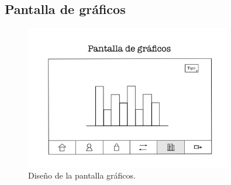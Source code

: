 \newpage

\subsection{Pantalla de gráficos}

\begin{figure}[ht]
	\centering
	\includegraphics[width=0.8\textwidth, angle=270]{imagenes/pantalla_graficos.JPG}
	\caption{Diseño de la pantalla gráficos.}
	\label{fig:pantallagraficos}
\end{figure}
